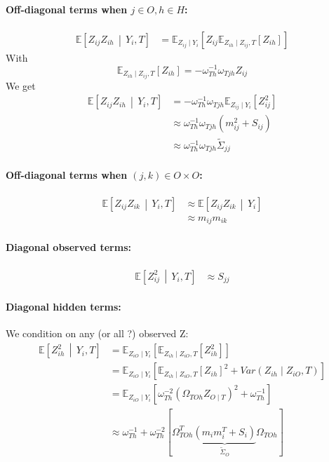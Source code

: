 \documentclass[11pt,a4paper]{article}
\newcommand{\Esp}{\mathds{E}}
\begin{document}
\paragraph{Off-diagonal terms when $j\in O, h\in H$:}
\begin{align*}
\Esp\left[ Z_{ij} Z_{ih} \,\middle\vert\,  Y_i,T \right] &=\Esp_{Z_{ij}\mid Y_i}\left[Z_{ij} \Esp_{Z_{ih}\mid  Z_{ij},T}[Z_{ih}]\right]
\end{align*}
With $$\Esp_{Z_{ih}\mid Z_{ij},T}[Z_{ih}] = -\omega_{Th}^{-1}\omega_{Tjh} Z_{ij}$$
We get
\begin{align*}
\Esp\left[ Z_{ij} Z_{ih} \,\middle\vert\,  Y_i,T \right] &= -\omega_{Th}^{-1}\omega_{Tjh} \Esp_{Z_{ij}\mid Y_i}\left[Z_{ij}^2  \right]\\
&\approx \omega_{Th}^{-1}\omega_{Tjh} (m_{ij}^2 + S_{ij})\\
&\approx \omega_{Th}^{-1}\omega_{Tjh} \tilde{\Sigma}_{jj}
\end{align*}

\paragraph{Off-diagonal terms  when $(j,k)\in O\times O$:}
\begin{align*}
\Esp\left[ Z_{ij} Z_{ik} \,\middle\vert\,  Y_i,T \right] & \approx\Esp\left[Z_{ij} Z_{ik}  \,\middle\vert\,  Y_i\right]\\
&\approx  m_{ij}m_{ik}
\end{align*}
\paragraph{Diagonal observed terms:}
\begin{align*}
\Esp\left[ Z_{ij}^2 \,\middle\vert\,  Y_i,T \right] & \approx S_{jj}
\end{align*}
\paragraph{Diagonal hidden terms:\\}
We condition on any (or all ?) observed Z:
 \begin{align*}
\Esp\left[ Z_{ih}^2 \,\middle\vert\,  Y_i,T \right] & = \Esp_{Z_{iO}\mid Y_i}\left[ \Esp_{Z_{ih}\mid  Z_{iO},T}[Z_{ih}^2]\right]\\
&= \Esp_{Z_{iO}\mid Y_i}\left[ \Esp_{Z_{ih}\mid  Z_{iO},T}[Z_{ih}]^2 + Var(Z_{ih} \mid Z_{iO}, T)\right]\\
&= \Esp_{Z_{iO}\mid Y_i}\left[ \omega_{Th}^{-2}(\Omega_{TOh}Z_{O\mid T})^2 + \omega_{Th}^{-1}\right]\\
& \approx \omega_{Th}^{-1}+\omega_{Th}^{-2}[\Omega_{TOh}^T\underbrace{(m_im_i^T+S_i)}_{\tilde{\Sigma}_O}\Omega_{TOh}]
\end{align*}
\end{document}

